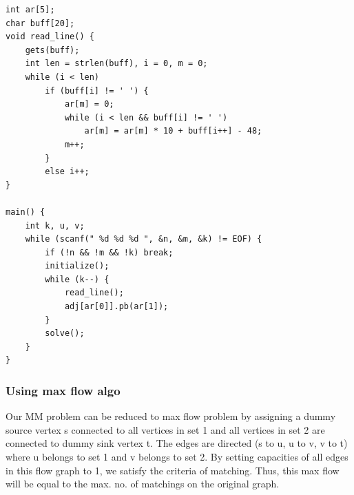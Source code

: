 \documentclass[8pt, a4paper, oneside, twocolumn]{extarticle}
\begin{document}
\begin{enumerate}
\begin{verbatim}
int ar[5];
char buff[20];
void read_line() {
    gets(buff);
    int len = strlen(buff), i = 0, m = 0;
    while (i < len)
        if (buff[i] != ' ') {
            ar[m] = 0;
            while (i < len && buff[i] != ' ')
                ar[m] = ar[m] * 10 + buff[i++] - 48;
            m++;
        }
        else i++;
}

main() {
    int k, u, v;
    while (scanf(" %d %d %d ", &n, &m, &k) != EOF) {
        if (!n && !m && !k) break;
        initialize();
        while (k--) {
            read_line();
            adj[ar[0]].pb(ar[1]);
        }
        solve();
    }
}
    \end{verbatim}
\end{enumerate}
\subsubsection{Using max flow algo}
Our MM problem can be reduced to max flow problem by assigning a dummy source vertex s connected to all vertices in set 1 and all vertices in set 2 are connected to dummy sink vertex t. The edges are directed (s to u, u to v, v to t) where u belongs to set 1 and v belongs to set 2. By setting capacities of all edges in this flow graph to 1, we satisfy the criteria of matching. Thus, this max flow will be equal to the max. no. of matchings on the original graph.
\end{document}
